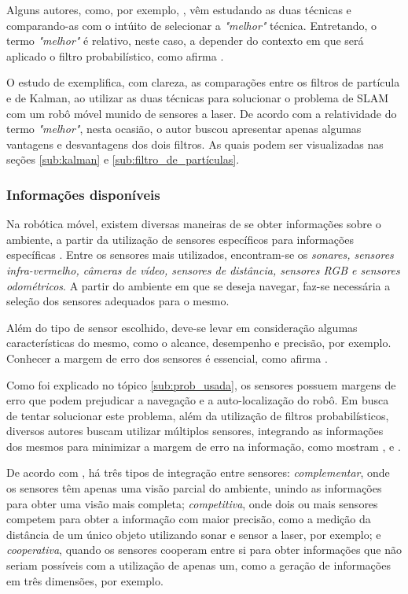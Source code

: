 			Alguns autores, como, por exemplo, \cite{comparacaoKalmanParticulas}, vêm estudando as duas técnicas e comparando-as com o intúito de selecionar a \textit{"melhor"} técnica. Entretando, o termo \textit{"melhor"} é relativo, neste caso, a depender do contexto em que será aplicado o filtro probabilístico, como afirma \cite{comparacaoKalmanParticulas}.

			O estudo de \cite{comparacaoKalmanParticulas} exemplifica, com clareza, as comparações entre os filtros de partícula e de Kalman, ao utilizar as duas técnicas para solucionar o problema de SLAM com um robô móvel munido de sensores a laser. De acordo com a relatividade do termo \textit{"melhor"}, nesta ocasião, o autor buscou apresentar apenas algumas vantagens e desvantagens dos dois filtros. As quais podem ser visualizadas nas seções \ref{sub:kalman} e \ref{sub:filtro_de_partículas}. 

		\subsubsection{Informações disponíveis}
		\label{sub:infos_disponiveis}

			Na robótica móvel, existem diversas maneiras de se obter informações sobre o ambiente, a partir da utilização de sensores específicos para informações específicas \cite{interacaoRoboAmbiente}. Entre os sensores mais utilizados, encontram-se os \textit{sonares, sensores infra-vermelho, câmeras de vídeo, sensores de distância, sensores RGB e sensores odométricos}. A partir do ambiente em que se deseja navegar, faz-se necessária a seleção dos sensores adequados para o mesmo.

			Além do tipo de sensor escolhido, deve-se levar em consideração algumas características do mesmo, como o alcance, desempenho e precisão, por exemplo. Conhecer a margem de erro dos sensores é essencial, como afirma \cite{wall_following}. 

			Como foi explicado no tópico \ref{sub:prob_usada}, os sensores possuem margens de erro que podem prejudicar a navegação e a auto-localização do robô. Em busca de tentar solucionar este problema, além da utilização de filtros probabilísticos, diversos autores buscam utilizar múltiplos sensores, integrando as informações dos mesmos para minimizar a margem de erro na informação, como mostram \cite{fusingSensorsParallel}, \cite{neuralNetwork} e \cite{slamProblem}. 

			De acordo com \cite{agenteExploratorioKalman}, há três tipos de integração entre sensores: \textit{complementar}, onde os sensores têm apenas uma visão parcial do ambiente, unindo as informações para obter uma visão mais completa; \textit{competitiva}, onde dois ou mais sensores competem para obter a informação com maior precisão, como a medição da distância de um único objeto utilizando sonar e sensor a laser, por exemplo; e \textit{cooperativa}, quando os sensores cooperam entre si para obter informações que não seriam possíveis com a utilização de apenas um, como a geração de informações em três dimensões, por exemplo.

